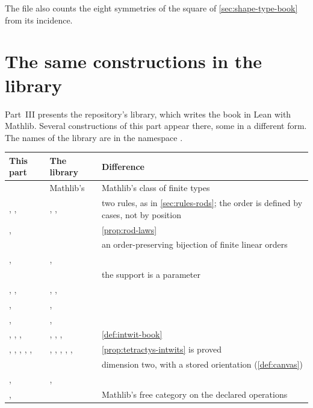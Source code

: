 The file also counts the eight symmetries of the square of
\cref{sec:shape-type-book} from its incidence.

\section*{The same constructions in the library}

Part~III presents the repository's library, which writes the book in Lean
with Mathlib. Several constructions of this part appear there, some in a
different form. The names of the library are in the namespace .

{\small
\renewcommand{\arraystretch}{1.1}
\begin{xltabular}{\textwidth}{@{}>{\raggedright\arraybackslash}p{.27\textwidth} >{\raggedright\arraybackslash}p{.33\textwidth} >{\raggedright\arraybackslash}X@{}}
\toprule
This part & The library & Difference\\ \midrule
\endhead
{} & Mathlib's  & Mathlib's class of finite types\\
, ,  & , ,  & two rules, as in \cref{sec:rules-rods}; the order is defined by cases, not by position\\
,  &  & \cref{prop:rod-laws}\\
 &  & an order-preserving bijection of finite linear orders\\
,  & ,  & \\
 &  & the support is a parameter\\
, ,  & , ,  & \\
,  & ,  & \\
,  & ,  & \\
, , ,  & , , ,  & \cref{def:intwit-book}\\
, , , , ,  & , , , , ,  & \cref{prop:tetractys-intwits} is proved\\
 &  & dimension two, with a stored orientation (\cref{def:canvas})\\
,  & ,  & \\
,  &  & Mathlib's free category on the declared operations\\
\bottomrule
\end{xltabular}}

